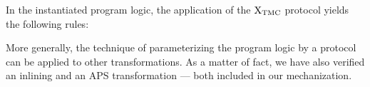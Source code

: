 In the instantiated program logic, the application of the $\mathrm{X}_\mathrm{TMC}$ protocol yields the following rules:

More generally, the technique of parameterizing the program logic by a protocol can be applied to other transformations.
As a matter of fact, we have also verified an inlining and an APS transformation --- both included in our mechanization.

